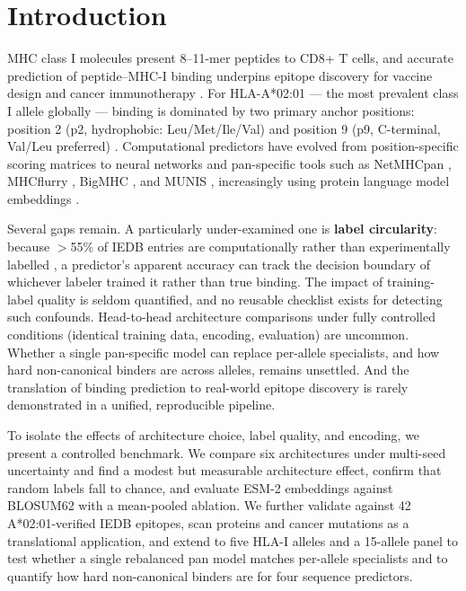 \section{Introduction}\label{sec:introduction}

MHC class I molecules present 8--11-mer peptides to CD8+ T cells, and accurate prediction of peptide--MHC-I binding underpins epitope discovery for vaccine design and cancer immunotherapy \citep{Falk91,Lundegaard11}. For HLA-A*02:01 --- the most prevalent class I allele globally --- binding is dominated by two primary anchor positions: position 2 (p2, hydrophobic: Leu/Met/Ile/Val) and position 9 (p9, C-terminal, Val/Leu preferred) \citep{Ruppert93,Rammensee95}. Computational predictors have evolved from position-specific scoring matrices to neural networks and pan-specific tools such as NetMHCpan \citep{Reynisson20}, MHCflurry \citep{ODonnell20}, BigMHC \citep{Albert23}, and MUNIS \citep{Wohlwend25}, increasingly using protein language model embeddings \citep{Rives21}.

Several gaps remain. A particularly under-examined one is \textbf{label circularity}: because $>$55\% of IEDB entries are computationally rather than experimentally labelled \citep{Preibisch26}, a predictor's apparent accuracy can track the decision boundary of whichever labeler trained it rather than true binding. The impact of training-label quality is seldom quantified, and no reusable checklist exists for detecting such confounds. Head-to-head architecture comparisons under fully controlled conditions (identical training data, encoding, evaluation) are uncommon. Whether a single pan-specific model can replace per-allele specialists, and how hard non-canonical binders are across alleles, remains unsettled. And the translation of binding prediction to real-world epitope discovery is rarely demonstrated in a unified, reproducible pipeline.

To isolate the effects of architecture choice, label quality, and encoding, we present a controlled benchmark. We compare six architectures under multi-seed uncertainty and find a modest but measurable architecture effect, confirm that random labels fall to chance, and evaluate ESM-2 embeddings against BLOSUM62 with a mean-pooled ablation. We further validate against 42 A*02:01-verified IEDB epitopes, scan proteins and cancer mutations as a translational application, and extend to five HLA-I alleles and a 15-allele panel to test whether a single rebalanced pan model matches per-allele specialists and to quantify how hard non-canonical binders are for four sequence predictors.
